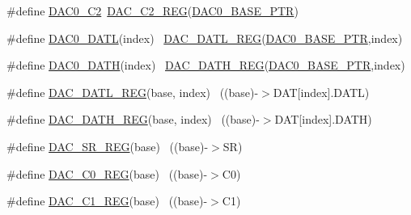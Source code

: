 \begin{DoxyCompactItemize}
\item 
\#define \hyperlink{group___d_a_c___register___accessor___macros_ga1f3d911fd37856fcdd26fe596f884c09}{D\+A\+C0\+\_\+\+C2}~\hyperlink{group___d_a_c___register___accessor___macros_ga5627f7a03cdcede26b3f5a60bc7a3871}{D\+A\+C\+\_\+\+C2\+\_\+\+R\+EG}(\hyperlink{group___d_a_c___peripheral_gabe3b30df06ec04e5c899efd6e49f1800}{D\+A\+C0\+\_\+\+B\+A\+S\+E\+\_\+\+P\+TR})
\item 
\#define \hyperlink{group___d_a_c___register___accessor___macros_gad1e226ca5378cccb3032a3e65ee3aabd}{D\+A\+C0\+\_\+\+D\+A\+TL}(index)                                              ~\hyperlink{group___d_a_c___register___accessor___macros_gabf321758d2caebaf297aed5907b1bb5d}{D\+A\+C\+\_\+\+D\+A\+T\+L\+\_\+\+R\+EG}(\hyperlink{group___d_a_c___peripheral_gabe3b30df06ec04e5c899efd6e49f1800}{D\+A\+C0\+\_\+\+B\+A\+S\+E\+\_\+\+P\+TR},index)
\item 
\#define \hyperlink{group___d_a_c___register___accessor___macros_gab4d4a155e15a18015eddcab55644a588}{D\+A\+C0\+\_\+\+D\+A\+TH}(index)                                              ~\hyperlink{group___d_a_c___register___accessor___macros_ga2993d3474a391b72469826f58317edc9}{D\+A\+C\+\_\+\+D\+A\+T\+H\+\_\+\+R\+EG}(\hyperlink{group___d_a_c___peripheral_gabe3b30df06ec04e5c899efd6e49f1800}{D\+A\+C0\+\_\+\+B\+A\+S\+E\+\_\+\+P\+TR},index)
\item 
\#define \hyperlink{group___d_a_c___register___accessor___macros_gabf321758d2caebaf297aed5907b1bb5d}{D\+A\+C\+\_\+\+D\+A\+T\+L\+\_\+\+R\+EG}(base,  index)                              ~((base)-\/$>$D\+AT\mbox{[}index\mbox{]}.D\+A\+TL)
\item 
\#define \hyperlink{group___d_a_c___register___accessor___macros_ga2993d3474a391b72469826f58317edc9}{D\+A\+C\+\_\+\+D\+A\+T\+H\+\_\+\+R\+EG}(base,  index)                              ~((base)-\/$>$D\+AT\mbox{[}index\mbox{]}.D\+A\+TH)
\item 
\#define \hyperlink{group___d_a_c___register___accessor___macros_ga6f61e2c24c3ca2e6207c3a46a95da33a}{D\+A\+C\+\_\+\+S\+R\+\_\+\+R\+EG}(base)                                              ~((base)-\/$>$SR)
\item 
\#define \hyperlink{group___d_a_c___register___accessor___macros_ga2ad6906035a9d1a45b0493f8010b630b}{D\+A\+C\+\_\+\+C0\+\_\+\+R\+EG}(base)                                              ~((base)-\/$>$C0)
\item 
\#define \hyperlink{group___d_a_c___register___accessor___macros_ga4f28424aead9b953486830b6f3c4b3e6}{D\+A\+C\+\_\+\+C1\+\_\+\+R\+EG}(base)                                              ~((base)-\/$>$C1)

\end{DoxyCompactItemize}
